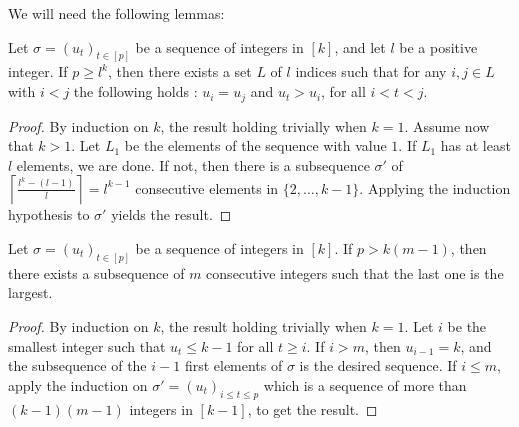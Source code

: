 \documentclass{endm}
\begin{document}
We will need the following lemmas:

%
%

\begin{lemma}\label{min}
Let $\sigma=(u_t)_{t\in [p]}$ be a sequence of integers in $[k]$, and let $l$ be a positive integer. If $p\geq l^k$, then there exists a set $L$ of $l$ indices such that for any $i,j \in L$ with $i < j$ the following holds : $u_i=u_j$ and $u_t > u_i$, for all $i < t < j$. \end{lemma}

\begin{proof}
By induction on $k$, the result holding trivially when $k=1$. Assume now that $k>1$. Let $L_1$ be the elements of the sequence with value $1$. If $L_1$ has at least $l$ elements, we are done.
If not, then there is a subsequence $\sigma'$ of $\left\lceil \frac{l^k-(l-1)}{l}\right \rceil = l^{k-1}$ consecutive elements in $\{2, \dots , k-1\}$. Applying the induction hypothesis to $\sigma'$ yields the result.
\end{proof}

\begin{lemma}\label{max}
Let $\sigma=(u_t)_{t\in [p]}$ be a sequence of integers in $[k]$. 
If $p > k (m-1)$, then there exists a subsequence of $m$ consecutive integers such that the
last one is the largest.
\end{lemma}

\begin{proof}
By induction on $k$, the result holding trivially when $k=1$. 
Let $i$ be the smallest integer such that $u_t\leq k-1$ for all $t\geq i$.
If $i>m$, then $u_{i-1}=k$, and the subsequence of the $i-1$ first elements of $\sigma$ is the desired sequence.
If $i\leq m$, apply the induction on $\sigma'=(u_t)_{i\leq t\leq p}$ which is a sequence of more than $(k-1)(m-1)$ integers in $[k-1]$, to get the result. 
\end{proof}
\end{document}
